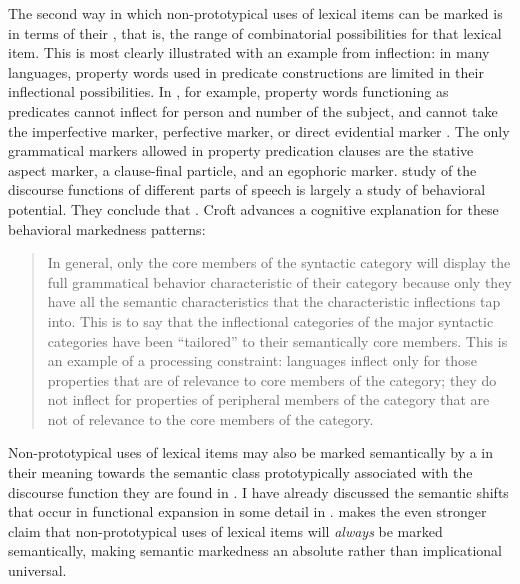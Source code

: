The second way in which non-prototypical uses of lexical items can be marked is in terms of their , that is, the range of combinatorial possibilities for that lexical item. This is most clearly illustrated with an example from inflection: in many languages, property words used in predicate constructions are limited in their inflectional possibilities. In , for example, property words functioning as predicates cannot inflect for person and number of the subject, and cannot take the imperfective marker, perfective marker, or direct evidential marker \parencite[96--97]{Bai2019}. The only grammatical markers allowed in property predication clauses are the stative aspect marker, a clause-final particle, and an egophoric marker.  study of the discourse functions of different parts of speech is largely a study of behavioral potential. They conclude that . Croft advances a cognitive explanation for these behavioral markedness patterns:

\blockquote[{\cite[86]{Croft1991}}]{In general, only the core members of the syntactic category will display the full grammatical behavior characteristic of their category because only they have all the semantic characteristics that the characteristic inflections tap into. This is to say that the inflectional categories of the major syntactic categories have been \enquote{tailored} to their semantically core members. This is an example of a processing constraint: languages inflect only for those properties that are of relevance to core members of the category; they do not inflect for properties of peripheral members of the category that are not of relevance to the core members of the category.}

Non-prototypical uses of lexical items may also be marked semantically by a  in their meaning towards the semantic class prototypically associated with the discourse function they are found in \parencites[96]{Croft2000}[73]{Croft2001b}[68]{CroftLier2012}. I have already discussed the semantic shifts that occur in functional expansion in some detail in . \textcite[60--61]{Croft1991} makes the even stronger claim that non-prototypical uses of lexical items will \emph{always} be marked semantically, making semantic markedness an absolute rather than implicational universal.

